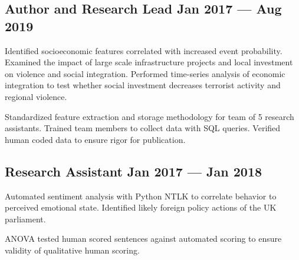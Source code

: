 \documentclass[letter,10pt]{article}
\begin{document}
\subsection{{Author and Research Lead  \hfill Jan 2017 --- Aug 2019}}
\begin{zitemize}
    \item{Identified socioeconomic features correlated with increased event probability.  Examined the impact of large scale infrastructure projects and local investment on violence and social integration. Performed time-series analysis of economic integration to test whether social investment decreases terrorist activity and regional violence.}
    \item{Standardized feature extraction and storage methodology for team of 5 research assistants.  Trained team members to collect data with SQL queries. Verified human coded data to ensure rigor for publication.}
\end{zitemize}

\subsection{{Research Assistant \hfill Jan 2017 --- Jan 2018}}
\begin{zitemize}
    \item{Automated sentiment analysis with Python NTLK to correlate behavior to perceived emotional state.  Identified likely foreign policy actions of the UK parliament.}
    \item{ANOVA tested human scored sentences against automated scoring to ensure validity of qualitative human scoring.}
\end{zitemize}
\end{document}
